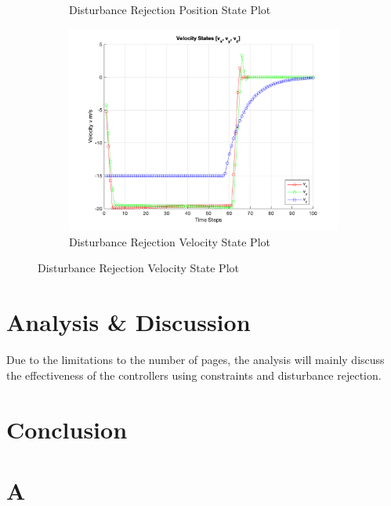 \documentclass[conference, tikz]{IEEEtran}
\begin{document}
\begin{figure}[H]
\begin{subfigure}{\columnwidth}
        \caption{Disturbance Rejection Position State Plot}
        \label{DR:pos_state}
    \end{subfigure}
    \begin{subfigure}{\columnwidth}
        \centering
        \includegraphics[width=\columnwidth]{new_final_figs/DR_Constrained_velocity_state_plot.png}
        \caption{Disturbance Rejection Velocity State Plot}
        \label{DR:vel_ss}
    \end{subfigure}
\end{figure}

\section{Analysis \& Discussion}
Due to the limitations to the number of pages, the analysis will mainly discuss the effectiveness of the controllers using constraints and disturbance rejection. \\


\section{Conclusion}


\newpage



\appendix

\section{A}
\end{document}
